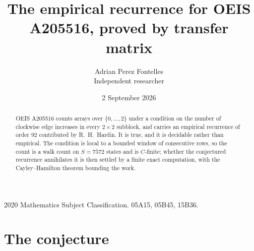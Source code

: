 \documentclass[11pt,a4paper]{article}
\title{The empirical recurrence for OEIS A205516, proved by transfer matrix}
\author{Adrian Perez Fontelles\\ \small Independent researcher}
\date{2 September 2026}
\theoremstyle{plain}
\theoremstyle{definition}
\begin{document}
\maketitle

\begin{abstract}
OEIS A205516 counts arrays over $\{0,\dots,2\}$ under a condition on the number of clockwise edge increases
in every $2\times2$ subblock, and carries an empirical recurrence of order $92$ contributed by
R.~H.~Hardin. It is true, and it is decidable rather than empirical. The condition is local to
a bounded window of consecutive rows, so the count is a walk count on $S=7572$ states and is
$C$-finite; whether the conjectured recurrence annihilates it is then settled by a finite exact
computation, with the Cayley--Hamilton theorem bounding the work.
\end{abstract}

\noindent\small 2020 Mathematics Subject Classification. 05A15, 05B45, 15B36.\normalsize

\section{The conjecture}
\end{document}
